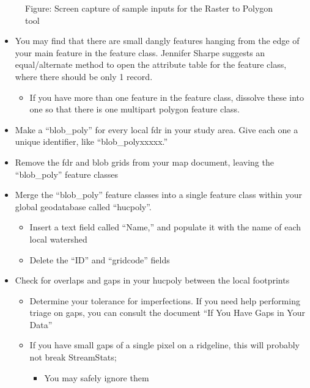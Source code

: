 \documentclass[letterpaper,10pt,english]{sphinxmanual}
\begin{document}
\begin{figure}[htbp]
\centering
\capstart

\noindent{}
\caption{Figure: Screen capture of sample inputs for the Raster to Polygon tool}\label{\detokenize{ex_2:id18}}\end{figure}
\begin{itemize}
\item {} 
You may find that there are small dangly features hanging from the edge of your main feature in the feature class. Jennifer Sharpe suggests an equal/alternate method to open the attribute table for the feature class, where there should be only 1 record.
\begin{itemize}
\item {} 
If you have more than one feature in the feature class, dissolve these into one so that there is one multipart polygon feature class.

\end{itemize}

\item {} 
Make a “blob\_poly” for every local fdr in your study area. Give each one a unique identifier, like “blob\_polyxxxxx.”

\item {} 
Remove the fdr and blob grids from your map document, leaving the “blob\_poly” feature classes

\item {} 
Merge the “blob\_poly” feature classes into a single feature class within your global geodatabase called “hucpoly”.
\begin{itemize}
\item {} 
Insert a text field called “Name,” and populate it with the name of each local watershed

\item {} 
Delete the “ID” and “gridcode” fields

\end{itemize}

\item {} 
Check for overlaps and gaps in your hucpoly between the local footprints
\begin{itemize}
\item {} 
Determine your tolerance for imperfections. If you need help performing triage on gaps, you can consult the document “If You Have Gaps in Your Data”

\item {} 
If you have small gaps of a single pixel on a ridgeline, this will probably not break StreamStats;
\begin{itemize}
\item {} 
You may safely ignore them


\end{itemize}
\end{itemize}
\end{itemize}
\end{document}
